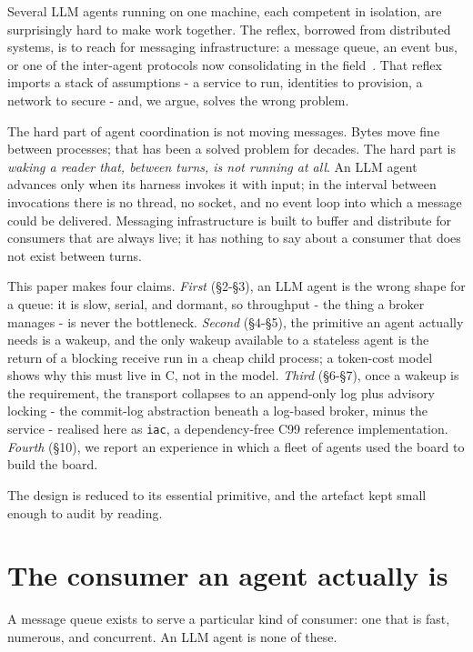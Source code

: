 \documentclass[11pt]{article}
\newcommand{\code}[1]{\texttt{#1}}
\begin{document}
Several LLM agents running on one machine, each competent in isolation, are surprisingly hard to make work together. The reflex, borrowed from distributed systems, is to reach for messaging infrastructure: a message queue, an event bus, or one of the inter-agent protocols now consolidating in the field~\cite{a2a,tap}. That reflex imports a stack of assumptions - a service to run, identities to provision, a network to secure - and, we argue, solves the wrong problem.

The hard part of agent coordination is not moving messages. Bytes move fine between processes; that has been a solved problem for decades. The hard part is \emph{waking a reader that, between turns, is not running at all}. An LLM agent advances only when its harness invokes it with input; in the interval between invocations there is no thread, no socket, and no event loop into which a message could be delivered. Messaging infrastructure is built to buffer and distribute for consumers that are always live; it has nothing to say about a consumer that does not exist between turns.

This paper makes four claims. \emph{First} (\S2-\S3), an LLM agent is the wrong shape for a queue: it is slow, serial, and dormant, so throughput - the thing a broker manages - is never the bottleneck. \emph{Second} (\S4-\S5), the primitive an agent actually needs is a wakeup, and the only wakeup available to a stateless agent is the return of a blocking receive run in a cheap child process; a token-cost model shows why this must live in C, not in the model. \emph{Third} (\S6-\S7), once a wakeup is the requirement, the transport collapses to an append-only log plus advisory locking - the commit-log abstraction beneath a log-based broker, minus the service - realised here as \code{iac}, a dependency-free C99 reference implementation. \emph{Fourth} (\S10), we report an experience in which a fleet of agents used the board to build the board.

The design is reduced to its essential primitive, and the artefact kept small enough to audit by reading.

\section{The consumer an agent actually is}

A message queue exists to serve a particular kind of consumer: one that is fast, numerous, and concurrent. An LLM agent is none of these.
\end{document}
